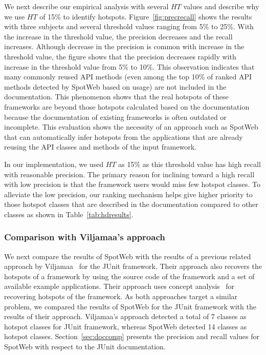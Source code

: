 \documentclass[conference]{IEEEtran}
\newcommand{\Fix}[1]{#1}
\begin{document}
We next describe our empirical analysis with several $HT$ values and describe
why we use $HT$ of 15\% to identify hotspots. Figure~\ref{fig:precrecall}
shows the results with three subjects and several threshold values ranging from 5\% to 25\%.
With the increase in the threshold value, the precision decreases
and the recall increases. \Fix{Although decrease in the precision is common with 
increase in the threshold value, the figure shows that the precision
decreases rapidly with increase in the threshold value from 5\% to 10\%. 
This observation indicates that many commonly reused API methods (even among the top 10\% 
of ranked API methods detected by SpotWeb based on usage) are not included in the documentation. This phenomenon
shows that the real hotspots of these frameworks are beyond those hotspots
calculated based on the documentation because the documentation
of existing frameworks is often outdated or incomplete.} This evaluation shows the necessity
of an approach such as SpotWeb that can automatically infer hotspots
from the applications that are already reusing the API classes and methods of the input framework.

In our implementation, we used $HT$ as 15\%
as this threshold value has high recall with reasonable precision.
The primary reason for inclining toward a high recall with low precision
is that the framework users would miss few hotspot classes. To alleviate the low precision,
our ranking mechanism helps give higher priority to those
hotspot classes that are described in the documentation compared
to other classes as shown in Table~\ref{tab:hdresults}.
\subsubsection{Comparison with Viljamaa's approach}
We next compare the results of SpotWeb with the results of a previous related approach by Viljamaa~\cite{viljamaa:reverse}
for the JUnit framework. Their approach also recovers the hotspots of a framework
by using the source code of the framework and a set of available example applications. Their approach
uses concept analysis~\cite{ganter:concept} for recovering hotspots of the framework. As both approaches target
a similar problem, we compared the results of SpotWeb for the JUnit framework with the
results of their approach. \Fix{Viljamaa's approach detected a total of 7 classes
as hotspot classes for JUnit framework, whereas SpotWeb detected 14 classes
as hotspot classes. Section~\ref{sec:doccomp} presents the precision
and recall values for SpotWeb with respect to the JUnit documentation.}
\end{document}
